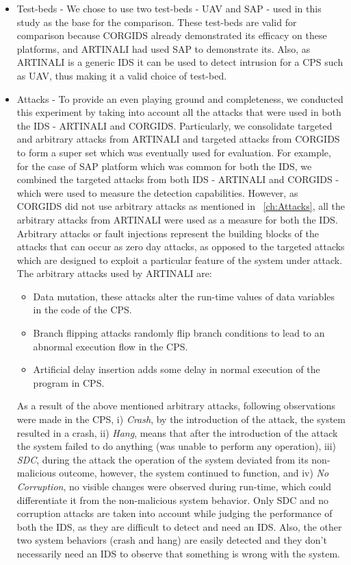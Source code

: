 \begin{itemize}
\item Test-beds - We chose to use two test-beds - \ac{UAV} and \ac{SAP} - used in this study as the base for the comparison. These test-beds are valid for comparison because \ac{CORGIDS} already demonstrated its efficacy on these platforms, and ARTINALI had used \ac{SAP} to demonstrate its. Also, as ARTINALI is a generic \ac{IDS} it can be used to detect intrusion for a \ac{CPS} such as \ac{UAV}, thus making it  a valid choice of test-bed.

\item Attacks - To provide an even playing ground and completeness, we conducted this experiment by taking into account all the attacks that were used in both the \ac{IDS} - ARTINALI and \ac{CORGIDS}. Particularly, we consolidate targeted and arbitrary attacks from ARTINALI and targeted attacks from \ac{CORGIDS} to form a super set which was eventually used for evaluation. For example, for the case of \ac{SAP} platform which was common for both the \ac{IDS}, we combined the targeted attacks from both \ac{IDS} - ARTINALI and \ac{CORGIDS} - which were used to measure the detection capabilities. However, as \ac{CORGIDS} did not use arbitrary attacks as mentioned in ~\autoref{ch:Attacks}, all the arbitrary attacks from ARTINALI were used as a measure for both the \ac{IDS}.
Arbitrary attacks or fault injections represent the building blocks of the attacks that can occur as zero day attacks, as opposed to the targeted attacks which are designed to exploit a particular feature of the system under attack. The arbitrary attacks used by ARTINALI are:

\begin{itemize}
\item Data mutation, these attacks alter the run-time values of data variables in the code of the \ac{CPS}.
\item Branch flipping attacks randomly flip branch conditions to lead to an abnormal execution flow in the \ac{CPS}.
\item Artificial delay insertion adds some delay in normal execution of the program in \ac{CPS}.
\end{itemize}

As a result of the above mentioned arbitrary attacks, following observations were made in the \ac{CPS}, i) \textit{Crash}, by the introduction of the attack, the system resulted in a crash, ii) \textit{Hang}, means that after the introduction of the attack the system failed to do anything (was unable to perform any operation), iii) \textit{\ac{SDC}}, during the attack the operation of the system deviated from its non-malicious outcome, however, the system continued to function, and iv) \textit{No Corruption}, no visible changes were observed during run-time, which could differentiate it from the non-malicious system behavior. Only \ac{SDC} and no corruption attacks are taken into account while judging the performance of both the \ac{IDS}, as they are difficult to detect and need an \ac{IDS}. Also, the other two system behaviors (crash and hang) are easily detected and they don't necessarily need an \ac{IDS} to observe that something is wrong with the system. 


\end{itemize}
